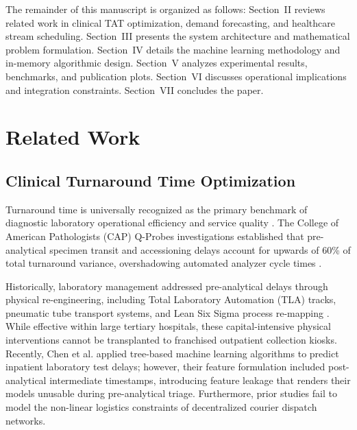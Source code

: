 \documentclass[conference]{IEEEtran}
\begin{document}
The remainder of this manuscript is organized as follows: Section~II reviews related work in clinical TAT optimization, demand forecasting, and healthcare stream scheduling. Section~III presents the system architecture and mathematical problem formulation. Section~IV details the machine learning methodology and in-memory algorithmic design. Section~V analyzes experimental results, benchmarks, and publication plots. Section~VI discusses operational implications and integration constraints. Section~VII concludes the paper.

\section{Related Work}

\subsection{Clinical Turnaround Time Optimization}
Turnaround time is universally recognized as the primary benchmark of diagnostic laboratory operational efficiency and service quality \cite{hawkins2007laboratory,valenstein1996turnaround}. The College of American Pathologists (CAP) Q-Probes investigations established that pre-analytical specimen transit and accessioning delays account for upwards of 60\% of total turnaround variance, overshadowing automated analyzer cycle times \cite{howanitz2002laboratory,stotler2002improving}. 

Historically, laboratory management addressed pre-analytical delays through physical re-engineering, including Total Laboratory Automation (TLA) tracks, pneumatic tube transport systems, and Lean Six Sigma process re-mapping \cite{belson2007technology}. While effective within large tertiary hospitals, these capital-intensive physical interventions cannot be transplanted to franchised outpatient collection kiosks. Recently, Chen et al. \cite{chen2019machine} applied tree-based machine learning algorithms to predict inpatient laboratory test delays; however, their feature formulation included post-analytical intermediate timestamps, introducing feature leakage that renders their models unusable during pre-analytical triage. Furthermore, prior studies fail to model the non-linear logistics constraints of decentralized courier dispatch networks.
\end{document}
